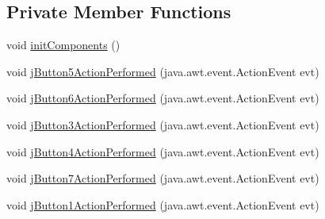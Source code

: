 \subsection*{Private Member Functions}
\begin{DoxyCompactItemize}
\item 
void \mbox{\hyperlink{class_interfaz_package_1_1_consulta_busqueda_a0043eafbbe113b4cca7fc86bba740940}{init\+Components}} ()
\item 
void \mbox{\hyperlink{class_interfaz_package_1_1_consulta_busqueda_a005ad36a62a45a951e73f6d37f28c883}{j\+Button5\+Action\+Performed}} (java.\+awt.\+event.\+Action\+Event evt)
\item 
void \mbox{\hyperlink{class_interfaz_package_1_1_consulta_busqueda_a2aa00c4b05ad23e9de48255e16c2ec5b}{j\+Button6\+Action\+Performed}} (java.\+awt.\+event.\+Action\+Event evt)
\item 
void \mbox{\hyperlink{class_interfaz_package_1_1_consulta_busqueda_aefe90b6a93c1980740aba8de6f1f137f}{j\+Button3\+Action\+Performed}} (java.\+awt.\+event.\+Action\+Event evt)
\item 
void \mbox{\hyperlink{class_interfaz_package_1_1_consulta_busqueda_ae40b8c7aa3f93785b928af92fe58d91f}{j\+Button4\+Action\+Performed}} (java.\+awt.\+event.\+Action\+Event evt)
\item 
void \mbox{\hyperlink{class_interfaz_package_1_1_consulta_busqueda_a390264bada5866106e6de1fc262ca5b7}{j\+Button7\+Action\+Performed}} (java.\+awt.\+event.\+Action\+Event evt)
\item 
void \mbox{\hyperlink{class_interfaz_package_1_1_consulta_busqueda_ab7479eeeb30a47204e0ce5435b2943f4}{j\+Button1\+Action\+Performed}} (java.\+awt.\+event.\+Action\+Event evt)
\end{DoxyCompactItemize}
